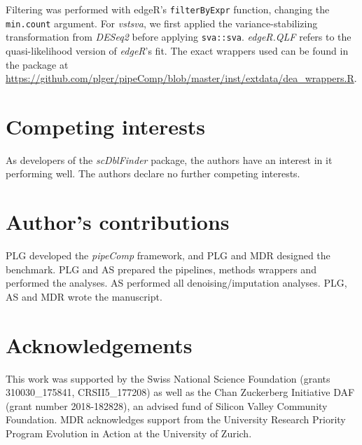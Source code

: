 \documentclass{bmcart}
\begin{document}
{Filtering was performed with edgeR's \texttt{filterByExpr} function, changing the \texttt{min.count} argument. For \textit{vstsva}, we first applied the variance-stabilizing transformation from \textit{DESeq2}\citep{loveModeratedEstimation2014} before applying \texttt{sva::sva}. \textit{edgeR.QLF} refers to the quasi-likelihood version \citep{lundDetectingDifferential2012} of \textit{edgeR}'s fit. The exact wrappers used can be found in the package at \url{https://github.com/plger/pipeComp/blob/master/inst/extdata/dea\_wrappers.R}.
}

\begin{backmatter}

\section*{Competing interests}
As developers of the \textit{scDblFinder} package, the authors have an interest in it performing well. The authors declare no further competing interests.

\section*{Author's contributions}
PLG developed the \textit{pipeComp} framework, and PLG and MDR designed the benchmark. PLG and AS prepared the pipelines, methods wrappers and performed the analyses. AS performed all denoising/imputation analyses. PLG, AS and MDR wrote the manuscript.

\section*{Acknowledgements}
This work was supported by the Swiss National Science Foundation (grants 310030\_175841, CRSII5\_177208) as well as the Chan Zuckerberg Initiative DAF (grant number 2018-182828), an advised fund of Silicon Valley Community Foundation. MDR acknowledges support from the University Research Priority Program Evolution in Action at the University of Zurich.



\end{backmatter}
\end{document}

